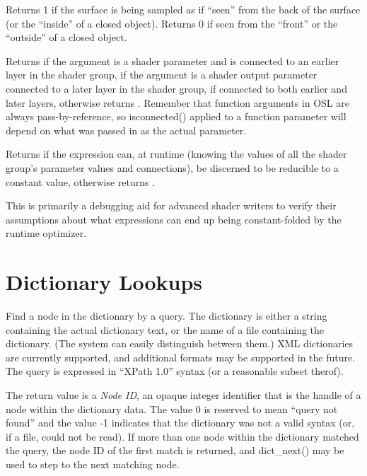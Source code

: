 \documentclass[11pt,letterpaper]{book}
\begin{document}
Returns 1 if the surface is being sampled as if ``seen'' from the back
of the surface (or the ``inside'' of a closed object). Returns 0 if seen
from the ``front'' or the ``outside'' of a closed object.
\apiend

Returns {} if the argument is a shader parameter and is connected
to an earlier layer in the shader group, 
{} if the argument is a shader output parameter connected
to a later layer in the shader group, {} if connected to both
earlier and later layers, otherwise returns {}.
Remember that function arguments in OSL are always pass-by-reference,
so {\cf isconnected()} applied to a function parameter will depend on
what was passed in as the actual parameter.
\apiend

Returns {} if the expression can, at runtime (knowing the values of all
the shader group's parameter values and connections), be discerned to be
reducible to a constant value, otherwise returns {}.

This is primarily a debugging aid for advanced shader writers to verify
their assumptions about what expressions can end up being constant-folded
by the runtime optimizer.
\apiend


\section{Dictionary Lookups}
\label{sec:stdlib:dictionaries}

    Find a node in the dictionary by a query.  The {\cf dictionary} is
    either a string containing the actual dictionary text, or the name
    of a file containing the dictionary.  (The system can easily
    distinguish between them.)  XML dictionaries are currently
    supported, and additional formats may be supported in the future.
    The query is expressed in ``XPath 1.0'' syntax (or a reasonable subset
    therof).

    The return value is a \emph{Node ID}, an opaque integer identifier
    that is the handle of a node within the dictionary data.  The value
    0 is reserved to mean ``query not found'' and the value -1 indicates
    that the dictionary was not a valid syntax (or, if a file, could not
    be read).  If more than one node within
    the dictionary matched the query, the node ID of the first match is
    returned, and {\cf dict_next()} may be used to step to the next
    matching node.
\end{document}

